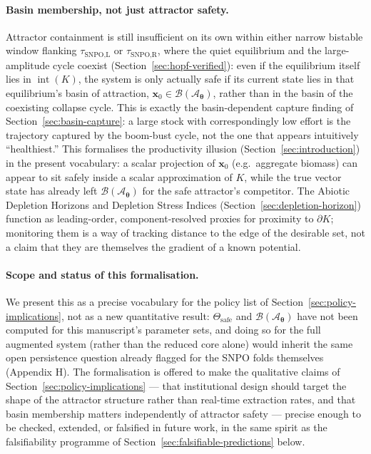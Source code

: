 \documentclass[twocolumn,10pt]{article}
\begin{document}
\paragraph{Basin membership, not just attractor safety.} Attractor containment is still insufficient on its own within either narrow bistable window flanking $\tau_{\text{SNPO,L}}$ or $\tau_{\text{SNPO,R}}$, where the quiet equilibrium and the large-amplitude cycle coexist (Section~\ref{sec:hopf-verified}): even if the equilibrium itself lies in $\operatorname{int}(K)$, the system is only actually safe if its current state lies in that equilibrium's basin of attraction, $\mathbf x_0\in\mathcal B(\mathcal A_{\boldsymbol\theta})$, rather than in the basin of the coexisting collapse cycle. This is exactly the basin-dependent capture finding of Section~\ref{sec:basin-capture}: a large stock with correspondingly low effort is the trajectory captured by the boom-bust cycle, not the one that appears intuitively ``healthiest.'' This formalises the productivity illusion (Section~\ref{sec:introduction}) in the present vocabulary: a scalar projection of $\mathbf x_0$ (e.g.\ aggregate biomass) can appear to sit safely inside a scalar approximation of $K$, while the true vector state has already left $\mathcal B(\mathcal A_{\boldsymbol\theta})$ for the safe attractor's competitor. The Abiotic Depletion Horizons and Depletion Stress Indices (Section~\ref{sec:depletion-horizon}) function as leading-order, component-resolved proxies for proximity to $\partial K$; monitoring them is a way of tracking distance to the edge of the desirable set, not a claim that they are themselves the gradient of a known potential.

\paragraph{Scope and status of this formalisation.} We present this as a precise vocabulary for the policy list of Section~\ref{sec:policy-implications}, not as a new quantitative result: $\Theta_{\text{safe}}$ and $\mathcal B(\mathcal A_{\boldsymbol\theta})$ have not been computed for this manuscript's parameter sets, and doing so for the full augmented system (rather than the reduced core alone) would inherit the same open persistence question already flagged for the SNPO folds themselves (Appendix H). The formalisation is offered to make the qualitative claims of Section~\ref{sec:policy-implications} — that institutional design should target the shape of the attractor structure rather than real-time extraction rates, and that basin membership matters independently of attractor safety — precise enough to be checked, extended, or falsified in future work, in the same spirit as the falsifiability programme of Section~\ref{sec:falsifiable-predictions} below.
\end{document}

